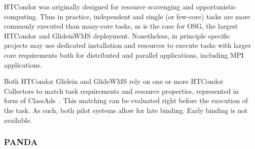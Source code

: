 \documentclass{sig-alternate}
\begin{document}
HTCondor was originally designed for resource scavenging and opportunistic
computing.  Thus in practice, independent and single (or few-core) tasks are
more commonly executed than many-core tasks, as is the case for OSG, the largest
HTCondor and GlideinWMS deployment. Nonetheless, in principle specific projects
may use dedicated installation and resources to execute tasks with larger core
requirements both for distributed and parallel applications, including MPI
applications. 


Both HTCondor Glidein and GlideWMS rely on one or more HTCondor Collectors to
match task requirements and resource properties, represented in form of
ClassAds~\cite{classad_url}. This matching can be evaluated right before the
execution of the task. As such, both pilot systems allow for late binding. Early
binding is not available.


%
\subsubsection{PANDA}
\label{sec:panda}
\end{document}
